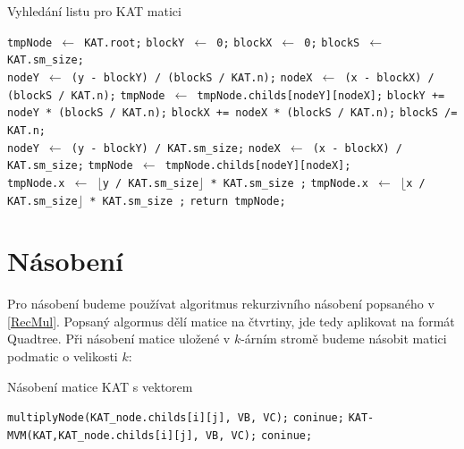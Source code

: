 \label{alg:kat-create}
\begin{algorithm}[H]
	\caption{Vyhledání listu pro KAT matici}\label{kat-create}
	\begin{algorithmic}[1]
		\State \texttt{tmpNode $\gets$ KAT.root;}
		\State \texttt{blockY $\gets$ 0;}
		\State \texttt{blockX $\gets$ 0;}
		\State \texttt{blockS $\gets$ KAT.sm\_size;}
		\\
			\State \texttt{nodeY $\gets$ (y - blockY) / (blockS / KAT.n);}
			\State \texttt{nodeX $\gets$ (x - blockX) / (blockS / KAT.n);}
			\State \texttt{tmpNode $\gets$ tmpNode.childs[nodeY][nodeX];}
			\State \texttt{blockY += nodeY * (blockS / KAT.n);}
			\State \texttt{blockX += nodeX * (blockS / KAT.n);}
			\State \texttt{blockS /= KAT.n;}
		\EndWhile
		\\
		\State \texttt{nodeY $\gets$ (y - blockY) / KAT.sm\_size;}
		\State \texttt{nodeX $\gets$ (x - blockX) / KAT.sm\_size;}
		\State \texttt{tmpNode $\gets$ tmpNode.childs[nodeY][nodeX];} 	
		\\
		\State \texttt{tmpNode.x $\gets$ $\lfloor$y / KAT.sm\_size$\rfloor$ * KAT.sm\_size ;}
		\State \texttt{tmpNode.x $\gets$ $\lfloor$x / KAT.sm\_size$\rfloor$ * KAT.sm\_size ;}
		\State \texttt{return tmpNode;}
		\EndProcedure
	\end{algorithmic}
\end{algorithm}

\section{Násobení}

Pro násobení budeme používat algoritmus rekurzivního násobení popsaného v \ref{RecMul}. Popsaný algormus dělí matice na čtvrtiny, jde tedy aplikovat na formát Quadtree. Při násobení matice uložené v $k$-árním stromě budeme násobit matici podmatic o velikosti $k$:

\label{alg:kat-mvm}
\begin{algorithm}[H]
	\caption{Násobení matice KAT s vektorem}\label{kat-mvm}
	\begin{algorithmic}[1]
						\State \texttt{multiplyNode(KAT\_node.childs[i][j], VB, VC);}
						\State \texttt{coninue;}
					\EndIf
						\State \texttt{KAT-MVM(KAT,KAT\_node.childs[i][j], VB, VC);}
						\State \texttt{coninue;}
					\EndIf
				\EndIf
			\EndFor
		\EndFor
		\EndProcedure
	\end{algorithmic}
\end{algorithm}

